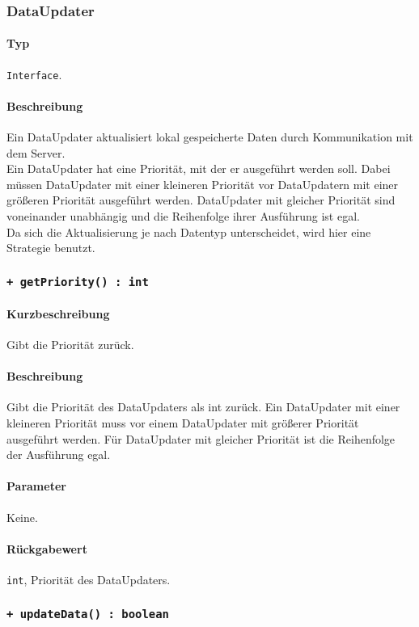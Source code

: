 \subsubsection{DataUpdater}\label{App_DocumentViewer_DataUpdater}
\paragraph*{Typ}
\texttt{Interface}.
\paragraph*{Beschreibung}
Ein DataUpdater aktualisiert lokal gespeicherte Daten durch Kommunikation mit dem Server.\\
Ein DataUpdater hat eine Priorität, mit der er ausgeführt werden soll. Dabei müssen 
DataUpdater mit einer kleineren Priorität vor DataUpdatern mit einer größeren Priorität 
ausgeführt werden. DataUpdater mit gleicher Priorität sind voneinander unabhängig und
die Reihenfolge ihrer Ausführung ist egal.\\
Da sich die Aktualisierung je nach Datentyp unterscheidet, wird hier eine Strategie benutzt.

\subsubsection*{\texttt{+ getPriority() : int}}\label{App_DocumentViewer_DataUpdater_getPriority}%
\paragraph*{Kurzbeschreibung}
Gibt die Priorität zurück.
\paragraph*{Beschreibung}
Gibt die Priorität des DataUpdaters als int zurück. Ein DataUpdater mit einer kleineren
Priorität muss vor einem DataUpdater mit größerer Priorität ausgeführt werden.
Für DataUpdater mit gleicher Priorität ist die Reihenfolge der Ausführung egal.
\paragraph*{Parameter}
Keine.
\paragraph*{Rückgabewert}
\texttt{int}, Priorität des DataUpdaters.

\subsubsection*{\texttt{+ updateData() : boolean}}\label{App_DocumentViewer_DataUpdater_updateData}%

